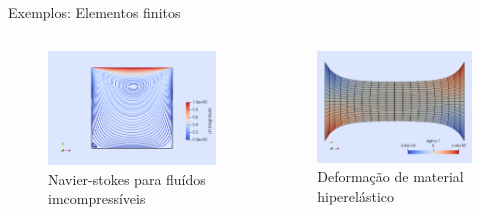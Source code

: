 \documentclass{beamer}
\begin{document}
		\begin{frame}{Exemplos: Elementos finitos}
			\begin{columns}
				\begin{column}{.5\linewidth}
					\begin{figure}
						\includegraphics[width=\linewidth]{navierstokes2d}
						\caption{Navier-stokes para fluídos imcompressíveis}
					\end{figure}
				\end{column}
				\begin{column}{.5\linewidth}
					\begin{figure}
						\includegraphics[width=\linewidth]{neohook}
						\caption{Deformação de material hiperelástico}
					\end{figure}
				\end{column}			
			\end{columns}
		\end{frame}
\end{document}
